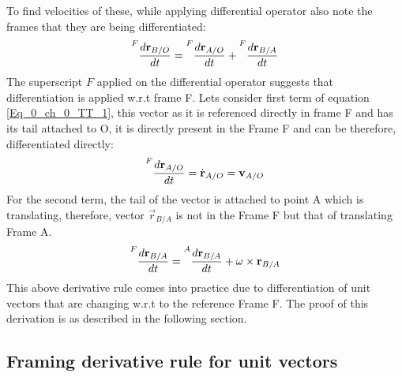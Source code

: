 To find velocities of these, while applying differential operator also note the frames that they are being differentiated:
\begin{equation} \label{Eq_0_ch_0_TT_1}
	\prescript{F}{}{\frac{d \vec{r}_{B/O}}{dt}} = \prescript{F}{}{\frac{d \vec{r}_{A/O}}{dt}} + \prescript{F}{}{\frac{d \vec{r}_{B/A}}{dt}}
\end{equation}
The superscript $F$ applied on the differential operator suggests that differentiation is applied w.r.t frame F. Lets consider first term of equation \eqref{Eq_0_ch_0_TT_1}, this vector as it is referenced directly in frame F and has its tail attached to O, it is directly present in the Frame F and can be therefore, differentiated directly:
\begin{equation}
	\prescript{F}{}{\frac{d \vec{r}_{A/O}}{dt}} = \dot{\vec{r}}_{A/O} = \vec{v}_{A/O}
\end{equation}
For the second term, the tail of the vector is attached to point A which is translating, therefore, vector $\vec{r}_{B/A}$ is not in the Frame F but that of translating Frame A. 
\begin{equation}
	\prescript{F}{}{\frac{d \vec{r}_{B/A}}{dt}} = \prescript{A}{}{\frac{d \vec{r}_{B/A}}{dt}} +   \omega_{} \times \vec{r}_{B/A}
\end{equation} 
This above derivative rule comes into practice due to differentiation of unit vectors that are changing w.r.t to the reference Frame F. The proof of this derivation is as described in the following section.

\subsection{Framing derivative rule for unit vectors}

